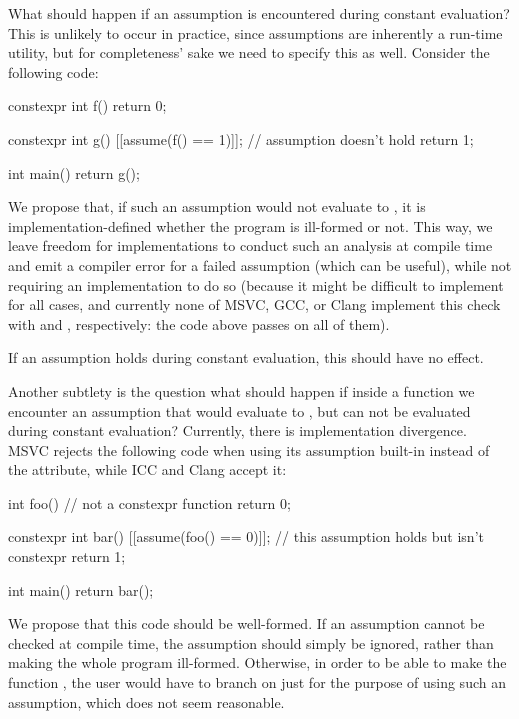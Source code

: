What should happen if an assumption is encountered during constant evaluation? This is unlikely to occur in practice, since assumptions are inherently a run-time utility, but for completeness' sake we need to specify this as well. Consider the following code:

\begin{codeblock}
constexpr int f() {
  return 0;
}

constexpr int g() {
  [[assume(f() == 1)]];  // assumption doesn't hold
  return 1;
}

int main() {
  return g();
}
\end{codeblock}

We propose that, if such an assumption would not evaluate to , it is implementation-defined whether the program is ill-formed or not. This way, we leave freedom for implementations to conduct such an analysis at compile time and emit a compiler error for a failed assumption (which can be useful), while not requiring an implementation to do so (because it might be difficult to implement for all cases, and currently none of MSVC, GCC, or Clang implement this check with  and , respectively: the code above passes on all of them).

If an assumption holds during constant evaluation, this should have no effect.

Another subtlety is the question what should happen if inside a  function we encounter an assumption that would evaluate to , but can not be evaluated during constant evaluation? Currently, there is implementation divergence. MSVC rejects the following code when using its assumption built-in instead of the attribute, while ICC and Clang accept it:

\begin{codeblock}
int foo() {     // not a constexpr function
  return 0; 
}

constexpr int bar() {
  [[assume(foo() == 0)]];  // this assumption holds but isn't constexpr
  return 1;
}

int main() {
  return bar();
}
\end{codeblock}

We propose that this code should be well-formed. If an assumption cannot be checked at compile time, the assumption should simply be ignored, rather than making the whole program ill-formed. Otherwise, in order to be able to make the function , the user would have to branch on  just for the purpose of using such an assumption, which does not seem reasonable.

